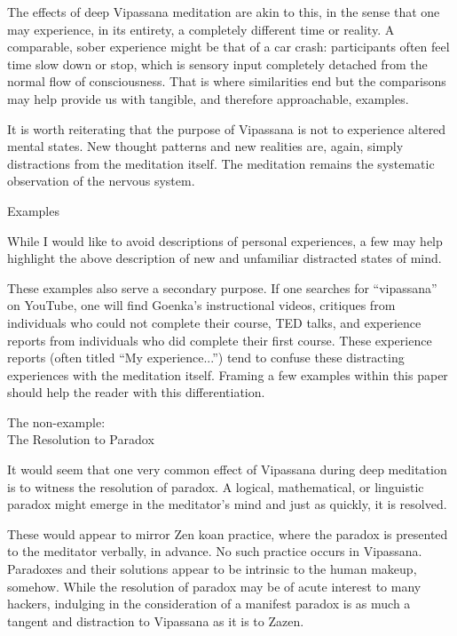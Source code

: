 \documentclass{article}
\begin{document}
The effects of deep Vipassana meditation are akin to this, in the sense that one may experience, in its entirety, a completely different time or reality. A comparable, sober experience might be that of a car crash: participants often feel time slow down or stop, which is sensory input completely detached from the normal flow of consciousness. That is where similarities end but the comparisons may help provide us with tangible, and therefore approachable, examples.

It is worth reiterating that the purpose of Vipassana is not to experience altered mental states. New thought patterns and new realities are, again, simply distractions from the meditation itself. The meditation remains the systematic observation of the nervous system.


\pagebreak

\begin{center}
  \Huge{Examples}
\end{center}

While I would like to avoid descriptions of personal experiences, a few may help highlight the above description of new and unfamiliar distracted states of mind.

These examples also serve a secondary purpose. If one searches for ``vipassana'' on YouTube, one will find Goenka's instructional videos, critiques from individuals who could not complete their course, TED talks, and experience reports from individuals who did complete their first course. These experience reports (often titled ``My experience...'') tend to confuse these distracting experiences with the meditation itself. Framing a few examples within this paper should help the reader with this differentiation.

\vspace{1cm}
\begin{center}
  \LARGE{The non-example:}\\
  \LARGE{The Resolution to Paradox}
\end{center}

It would seem that one very common effect of Vipassana during deep meditation is to witness the resolution of paradox. A logical, mathematical, or linguistic paradox might emerge in the meditator's mind and just as quickly, it is resolved.

These would appear to mirror Zen koan practice, where the paradox is presented to the meditator verbally, in advance. No such practice occurs in Vipassana. Paradoxes and their solutions appear to be intrinsic to the human makeup, somehow. While the resolution of paradox may be of acute interest to many hackers, indulging in the consideration of a manifest paradox is as much a tangent and distraction to Vipassana as it is to Zazen.
\end{document}
